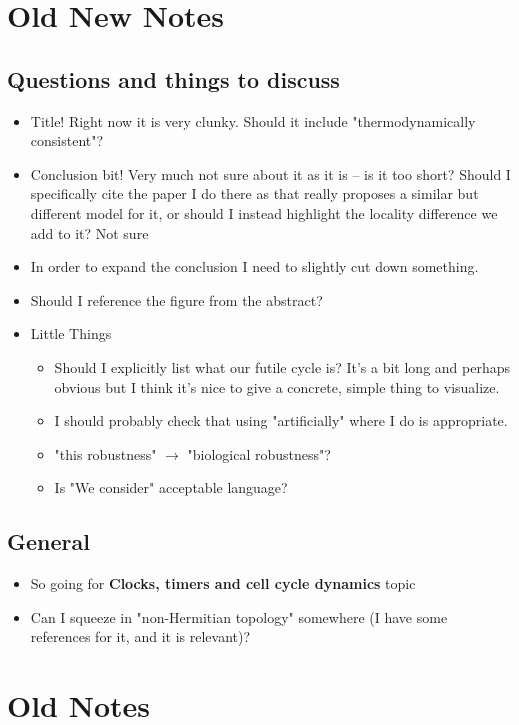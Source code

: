 \documentclass[11pt]{article}
\begin{document}
\newpage
\section{Old New Notes}
\subsection{Questions and things to discuss}
\begin{itemize}
	\item Title! Right now it is very clunky. Should it include "thermodynamically consistent"?
	\item Conclusion bit! Very much not sure about it as it is -- is it too short? Should I specifically cite the paper I do there as that really proposes a similar but different model for it, or should I instead highlight the locality difference we add to it? Not sure
	\item In order to expand the conclusion I need to slightly cut down something.
	\item Should I reference the figure from the abstract?
	\item Little Things \begin{itemize}
		      \item Should I explicitly list what our futile cycle is? It's a bit long and perhaps obvious but I think it's nice to give a concrete, simple thing to visualize.
		      \item I should probably check that using "artificially" where I do is appropriate.
		      \item "this robustness" $\rightarrow$ "biological robustness"?
		      \item Is "We consider" acceptable language?
	      \end{itemize}
\end{itemize}

\subsection{General}
\begin{itemize}
	\item So going for \textbf{Clocks, timers and cell cycle dynamics} topic
	\item Can I squeeze in "non-Hermitian topology" somewhere (I have some references for it, and it is relevant)?
\end{itemize}

\newpage
\section{Old Notes}
\end{document}
